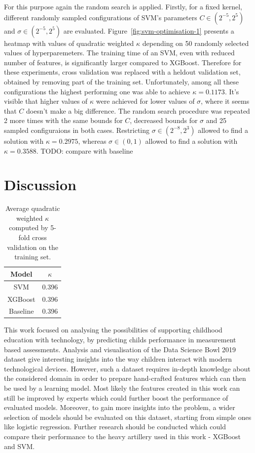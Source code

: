 \documentclass[fleqn,10pt]{SelfArx} %
\begin{document}
For this purpose again the random search is applied.
Firstly, for a fixed kernel, different randomly sampled configurations of SVM's parameters $C \in (2^{-5}, 2^5)$ and $\sigma \in (2^{-5}, 2^5)$ are evaluated.
Figure~\ref{fig:svm-optimisation-1} presents a heatmap with values of quadratic weighted $\kappa$ depending on 50 randomly selected values of hyperparemeters.
The training time of an SVM, even with reduced number of features, is significantly larger compared to XGBoost.
Therefore for these experiments, cross validation was replaced with a heldout validation set, obtained by removing part of the training set.
Unfortunately, among all these configurations the highest performing one was able to achieve $\kappa = 0.1173$.
It's visible that higher values of $\kappa$ were achieved for lower values of $\sigma$, where it seems that $C$ doesn't make a big difference.
The random search procedure was repeated 2 more times with the same bounds for $C$, decreased bounds for $\sigma$ and 25 sampled configuraions in both cases.
Restricting $\sigma \in (2^{-8}, 2^3)$ allowed to find a solution with $\kappa = 0.2975$, whereas $\sigma \in (0, 1)$ allowed to find a solution with $\kappa = 0.3588$.
TODO: compare with baseline


\section{Discussion}

\begin{table}
    \caption{Average quadratic weighted $\kappa$ computed by 5-fold cross validation on the training set.}
    \centering
    \begin{tabular}{c|c}
        Model & $\kappa$ \\
        \hline
        SVM & 0.396 \\
        XGBoost & 0.396 \\
        Baseline & 0.396 \\
    \end{tabular}
    \label{tab:model-results}
\end{table}

This work focused on analysing the possibilities of supporting childhood education with technology, by predicting childs performance in measurement based assessments.
Analysis and visualisation of the Data Science Bowl 2019 dataset give interesting insights into the way children interact with modern technological devices.
However, such a dataset requires in-depth knowledge about the considered domain in order to prepare hand-crafted features which can then be used by a learning model.
Most likely the features created in this work can still be improved by experts which could further boost the performance of evaluated models.
Moreover, to gain more insights into the problem, a wider selection of models should be evaluated on this dataset, starting from simple ones like logistic regression.
Further research should be conducted which could compare their performance to the heavy artillery used in this work - XGBoost and SVM.
\end{document}

